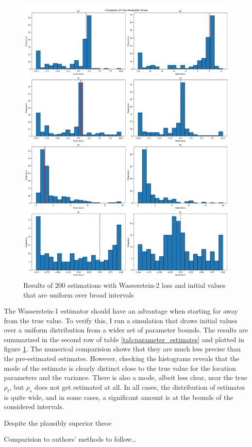 \begin{figure}
    \includegraphics[width=\textwidth]{./Images/w2_wide_uniform_histograms.png}
    \caption{Results of 200 estimations with Wasserstein-2 loss and initial values that are uniform over broad intervals}
    \label{fig:wide_uniform_histograms}
\end{figure}

The Wasserstein-1 estimator should have an advantage when starting far away from the true value.
To verify this, I run a simulation that draws initial values over a uniform distribution from a wider set of parameter bounds.
The results are summarized in the second row of table \ref{tab:parameter_estimates} and plotted in figure \ref{fig:wide_uniform_histograms}.
The numerical comparision shows that they are much less precise than the pre-estimated estimates.
However, checking the histograms reveals that the mode of the estimate is clearly distinct close to the true value for the location parameters and the variance.
There is also a mode, albeit less clear, near the true $\rho_t$, but $\rho_s$ does not get estimated at all.
In all cases, the distribution of estimates is quite wide, and in some cases, a significant amount is at the bounds of the considered intervals.

Despite the plausibly superior theoe

Comparision to authors' methods to follow\dots